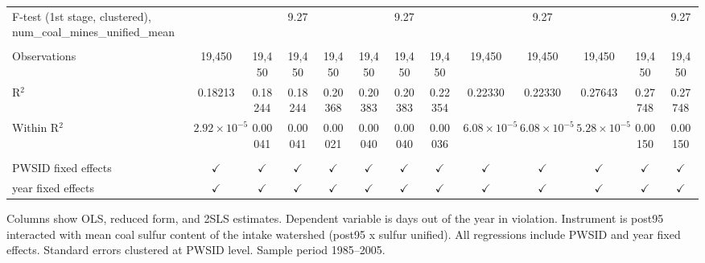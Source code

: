\begin{table}[htbp]
\begin{adjustbox}{width = \textwidth, center}
\begin{tabular}{lcccccccccccc}
         F-test (1st stage, clustered), num\_coal\_mines\_unified\_mean     &                       &               & 9.27          &               &               & 9.27          &               &                       & 9.27                  &                       &               & 9.27\\  
         
          \\
         
         Observations                                                       & 19,450                & 19,450        & 19,450        & 19,450        & 19,450        & 19,450        & 19,450        & 19,450                & 19,450                & 19,450                & 19,450        & 19,450\\  
         R$^2$                                                              & 0.18213               & 0.18244       & 0.18244       & 0.20368       & 0.20383       & 0.20383       & 0.22354       & 0.22330               & 0.22330               & 0.27643               & 0.27748       & 0.27748\\  
         Within R$^2$                                                       & $2.92\times 10^{-5}$  & 0.00041       & 0.00041       & 0.00021       & 0.00040       & 0.00040       & 0.00036       & $6.08\times 10^{-5}$  & $6.08\times 10^{-5}$  & $5.28\times 10^{-5}$  & 0.00150       & 0.00150\\  
         
          \\
         
         PWSID fixed effects                                                & $\checkmark$          & $\checkmark$  & $\checkmark$  & $\checkmark$  & $\checkmark$  & $\checkmark$  & $\checkmark$  & $\checkmark$          & $\checkmark$          & $\checkmark$          & $\checkmark$  & $\checkmark$\\   
         year fixed effects                                                 & $\checkmark$          & $\checkmark$  & $\checkmark$  & $\checkmark$  & $\checkmark$  & $\checkmark$  & $\checkmark$  & $\checkmark$          & $\checkmark$          & $\checkmark$          & $\checkmark$  & $\checkmark$\\   
         
         \bottomrule
         
      \end{tabular}
      
      
      
   \end{adjustbox}
      {\tiny\linespread{1}\selectfont \par \raggedright 
   Columns show OLS, reduced form, and 2SLS estimates. Dependent variable is days out of the year in violation. Instrument is post95 interacted with mean coal sulfur content of the intake watershed (post95 x sulfur unified). All regressions include PWSID and year fixed effects. Standard errors clustered at PWSID level. Sample period 1985--2005.}
   
\end{table}



